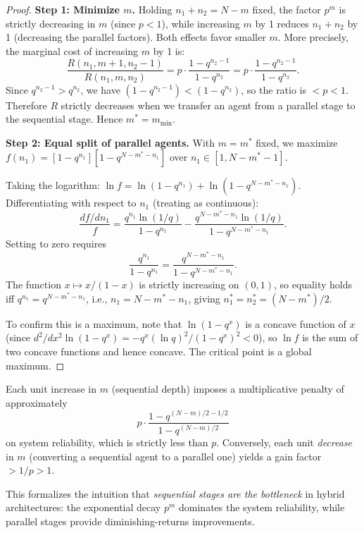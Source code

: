 \begin{proof}
\textbf{Step 1: Minimize $m$.}
Holding $n_1 + n_2 = N - m$ fixed, the factor $p^m$ is strictly decreasing in $m$
(since $p < 1$), while increasing $m$ by 1 reduces $n_1 + n_2$ by 1 (decreasing
the parallel factors).  Both effects favor smaller $m$.  More precisely, the
marginal cost of increasing $m$ by 1 is:
\[
  \frac{R(n_1, m+1, n_2-1)}{R(n_1, m, n_2)}
  = p \cdot \frac{1 - q^{n_2-1}}{1 - q^{n_2}}
  = p \cdot \frac{1 - q^{n_2-1}}{1 - q^{n_2}}.
\]
Since $q^{n_2-1} > q^{n_2}$, we have $(1 - q^{n_2-1}) < (1 - q^{n_2})$, so the
ratio is $< p < 1$.  Therefore $R$ strictly decreases when we transfer an agent
from a parallel stage to the sequential stage.  Hence $m^* = m_{\min}$.

\medskip\noindent
\textbf{Step 2: Equal split of parallel agents.}
With $m = m^*$ fixed, we maximize
$f(n_1) = [1 - q^{n_1}][1 - q^{N - m^* - n_1}]$
over $n_1 \in [1, N - m^* - 1]$.

Taking the logarithm: $\ln f = \ln(1 - q^{n_1}) + \ln(1 - q^{N-m^*-n_1})$.
Differentiating with respect to $n_1$ (treating as continuous):
\[
  \frac{df/dn_1}{f}
  = \frac{q^{n_1} \ln(1/q)}{1 - q^{n_1}}
  - \frac{q^{N-m^*-n_1} \ln(1/q)}{1 - q^{N-m^*-n_1}}.
\]
Setting to zero requires
\[
  \frac{q^{n_1}}{1 - q^{n_1}} = \frac{q^{N-m^*-n_1}}{1 - q^{N-m^*-n_1}}.
\]
The function $x \mapsto x/(1-x)$ is strictly increasing on $(0,1)$, so equality
holds iff $q^{n_1} = q^{N-m^*-n_1}$, i.e., $n_1 = N - m^* - n_1$, giving
$n_1^* = n_2^* = (N-m^*)/2$.

To confirm this is a maximum, note that $\ln(1 - q^x)$ is a concave function of $x$
(since $d^2/dx^2 \ln(1-q^x) = -q^x(\ln q)^2/(1-q^x)^2 < 0$), so $\ln f$ is the
sum of two concave functions and hence concave.  The critical point is a global maximum.
\end{proof}

\begin{corollary}
\label{cor:r4-seq-penalty}
Each unit increase in $m$ (sequential depth) imposes a multiplicative penalty of
approximately
\[
  p \cdot \frac{1 - q^{(N-m)/2 - 1/2}}{1 - q^{(N-m)/2}}
\]
on system reliability, which is strictly less than $p$.  Conversely, each unit
\emph{decrease} in $m$ (converting a sequential agent to a parallel one) yields a
gain factor $> 1/p > 1$.

This formalizes the intuition that \emph{sequential stages are the bottleneck}
in hybrid architectures: the exponential decay $p^m$ dominates the system reliability,
while parallel stages provide diminishing-returns improvements.
\end{corollary}

